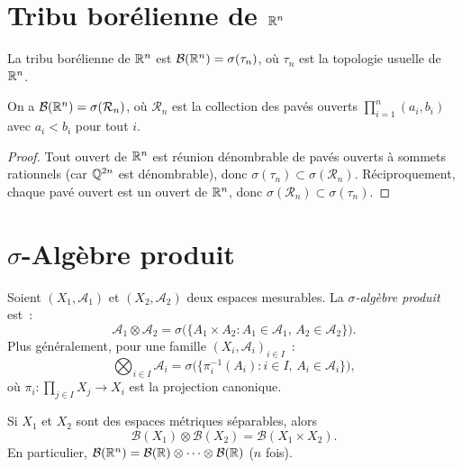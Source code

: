 \section{Tribu bor\'elienne de $\mathbb{R}^n$}

\begin{definition}
La tribu bor\'elienne de $\mathbb{R}^n$ est $\mathcal{B}(\mathbb{R}^n) = \sigma(\tau_n)$, o\`u
$\tau_n$ est la topologie usuelle de $\mathbb{R}^n$.
\end{definition}

\begin{proposition}
On a $\mathcal{B}(\mathbb{R}^n) = \sigma(\mathcal{R}_n)$, o\`u $\mathcal{R}_n$ est la
collection des pav\'es ouverts
$\prod_{i=1}^n (a_i, b_i)$ avec $a_i < b_i$ pour tout $i$.
\end{proposition}

\begin{proof}
Tout ouvert de $\mathbb{R}^n$ est r\'eunion d\'enombrable de pav\'es ouverts \`a sommets
rationnels (car $\mathbb{Q}^{2n}$ est d\'enombrable), donc
$\sigma(\tau_n) \subset \sigma(\mathcal{R}_n)$. R\'eciproquement, chaque pav\'e
ouvert est un ouvert de $\mathbb{R}^n$, donc $\sigma(\mathcal{R}_n) \subset \sigma(\tau_n)$.
\end{proof}

\section{$\sigma$-Alg\`ebre produit}

\begin{definition}
Soient $(X_1, \mathcal{A}_1)$ et $(X_2, \mathcal{A}_2)$ deux espaces mesurables.
La \emph{$\sigma$-alg\`ebre produit} est~:
\[
\mathcal{A}_1 \otimes \mathcal{A}_2 = \sigma\bigl(\{A_1 \times A_2 :
A_1 \in \mathcal{A}_1,\, A_2 \in \mathcal{A}_2\}\bigr).
\]
Plus g\'en\'eralement, pour une famille $(X_i, \mathcal{A}_i)_{i \in I}$~:
\[
\bigotimes_{i \in I} \mathcal{A}_i = \sigma\bigl(\{\pi_i^{-1}(A_i) :
i \in I,\, A_i \in \mathcal{A}_i\}\bigr),
\]
o\`u $\pi_i : \prod_{j \in I} X_j \to X_i$ est la projection canonique.
\end{definition}

\begin{theoreme}
\label{thm:borel_produit}
Si $X_1$ et $X_2$ sont des espaces m\'etriques s\'eparables, alors
\[
\mathcal{B}(X_1) \otimes \mathcal{B}(X_2) = \mathcal{B}(X_1 \times X_2).
\]
En particulier, $\mathcal{B}(\mathbb{R}^n) = \mathcal{B}(\mathbb{R}) \otimes \cdots \otimes
\mathcal{B}(\mathbb{R})$ ($n$ fois).
\end{theoreme}

